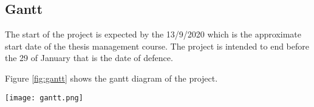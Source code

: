 \subsection{Gantt}

The start of the project is expected by the 13/9/2020 which is the approximate start date of the thesis management course. The project is intended to end before the 29 of January that is the date of defence.

Figure \ref{fig:gantt} shows the gantt diagram of the project.

\begin{sidewaysfigure}[htbp]
  \centering
  \texttt{[image: gantt.png]}
  \caption[Gantt diagram]{Gantt diagram. Own compilation.}
  \label{fig:gantt}
\end{sidewaysfigure}


